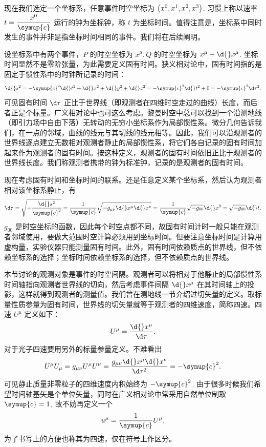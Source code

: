 \documentclass[UTF8, 12pt, a4paper, oneside, onecolumn, fontset=none]{ctexart}
\begin{document}
现在我们选定一个坐标系，任意事件时空坐标为 $\mleft(x^{0}, x^{1}, x^{2}, x^{3}\mright)$. 习惯上称以速率 $t=\dfrac{x^{0}}{\symup{c}}$ 运行的钟为坐标钟，称 $t$ 为坐标时间。值得注意是，坐标系中同时发生的事件并非是指坐标时间相同的事件。我们将在后续阐明。

设坐标系中有两个事件，$P$ 的时空坐标为 $x^{\mu}, Q$ 的时空坐标为 $x^{\mu}+\d{}x^{\mu}$. 坐标时间显然不是零阶张量，为此需要定义固有时间。狭义相对论中，固有时间指的是固定于惯性系中的时钟所记录的时间：
\begin{equation}
\d{}s^{2}=-\symup{c}^{2}\d{}t^{2}+\d{}x^{2}+\d{}y^{2}+\d{}z^{2}=-\symup{c}^{2}\d{}t^{2}+0=-\symup{c}^{2}\d\tau^{2}.
\end{equation}
可见固有时间 $\d\tau$ 正比于世界线（即观测者在四维时空走过的曲线）长度，而后者正是个标量。广义相对论中也可这么考虑。黎曼时空中总可以找到一个沿测地线（即引力场中自由下落）无转动的无穷小坐标系作为局部惯性系。微分几何告诉我们，在一点的邻域，曲线的线元与其切线的线元相等。因此，我们可以沿观测者的世界线逐点建立无数相对观测者静止的局部惯性系，将它们各自记录的固有时间加起来作为观测者的固有时间。按这种定义，观测者的固有时间依旧正比于观测者的世界线长度。我们称观测者携带的钟为标准钟，记录的是观测者的固有时间。

现在考虑固有时间和坐标时间的联系。还是任意定义某个坐标系，然后认为观测者相对该坐标系静止，有
\begin{equation}
\d\tau=\sqrt{-\frac{\d{}s^{2}}{\symup{c}^{2}}}=\frac{1}{\symup{c}}\sqrt{-g_{\mu\nu}\d{}x^{\mu}\d{}x^{\nu}}=\frac{1}{\symup{c}}\sqrt{-g_{00}}\d{}x^{0}=\sqrt{-g_{00}}\d{}t.\label{2.1.2}
\end{equation}
$g_{00}$ 是时空坐标的函数，因此每个时空点都不同，故固有时间计时一般只能在观测者邻域使用，要做大范围时空计算必须用到坐标时间。但要注意坐标时间是计算用虚构量，实验仪器只能测量固有时间。此外，固有时间依赖质点的世界线，但不依赖坐标系的选择；坐标时间依赖坐标系的选择，但不依赖质点的世界线。

本节讨论的观测对象是事件的时空间隔。观测者可以将相对于他静止的局部惯性系时间轴指向观测者世界线的切向，然后考虑事件间隔 $\d{}x^{\mu}$ 在其时间轴上的投影，这样就得到观测者的测量值。我们曾在测地线一节介绍过切矢量的定义。取标量性质参量为固有时间，世界线的切矢量就等于观测者的四维速度，简称四速。四速 $U^{\mu}$ 定义如下：
\begin{equation}
U^{\mu}=\frac{\d{}x^{\mu}}{\d\tau}.
\end{equation}
对于光子四速要用另外的标量参量定义。不难看出
\begin{equation}
U^{\mu}U_{\mu}=g_{\mu\nu}U^{\mu}U^{\nu}=\frac{g_{\mu\nu}\d{}x^{\mu}\d{}x^{\nu}}{\d\tau^{2}}=-\symup{c}^{2}.
\end{equation}
可见静止质量非零粒子的四维速度内积始终为 $-\symup{c}^{2}$. 由于很多时候我们希望时间轴基矢是个单位矢量，同时在广义相对论中常采用自然单位制取 $\symup{c}=1$, 故不妨再定义一个
\begin{equation}
u^{\mu}=\frac{1}{\symup{c}}U^{\mu},
\end{equation}
为了书写上的方便也称其为四速，仅在符号上作区分。
\end{document}
